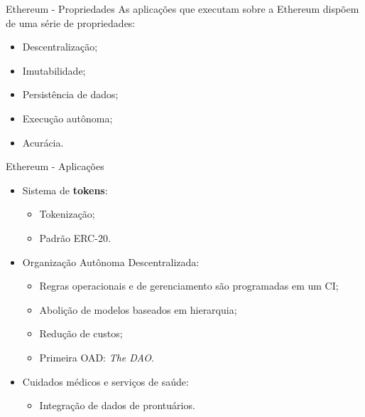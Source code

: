 \begin{frame}{Ethereum - Propriedades}
    As aplicações que executam sobre a Ethereum dispõem de uma série de propriedades:
    \begin{itemize}
        \item Descentralização;
        \item Imutabilidade;
        \item Persistência de dados;
        \item Execução autônoma;
        \item Acurácia.
    \end{itemize}
\end{frame}

\begin{frame}{Ethereum - Aplicações}
    \begin{itemize}
        \item Sistema de \textbf{tokens}:
        \begin{itemize}
            \item Tokenização;
            \item Padrão ERC-20.
        \end{itemize}
        \item Organização Autônoma Descentralizada:
        \begin{itemize}
            \item Regras operacionais e de gerenciamento são programadas em um CI;
            \item Abolição de modelos baseados em hierarquia;
            \item Redução de custos;
            \item Primeira OAD: \textit{The DAO}.
        \end{itemize}
        \item Cuidados médicos e serviços de saúde:
        \begin{itemize}
            \item Integração de dados de prontuários.
        \end{itemize}
    \end{itemize}
\end{frame}

